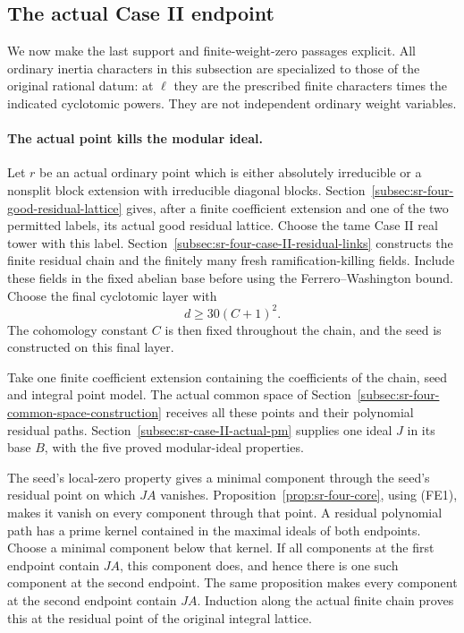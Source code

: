 \subsection{The actual Case II endpoint}
\label{subsec:sr-four-final-endpoint}

We now make the last support and finite-weight-zero passages
explicit. All ordinary inertia characters in this subsection
are specialized to those of the original rational datum:
at \(\ell\) they are the prescribed finite characters times
the indicated cyclotomic powers. They are not independent
ordinary weight variables.

\paragraph{The actual point kills the modular ideal.}
Let \(r\) be an actual ordinary point which is either
absolutely irreducible or a nonsplit block extension with
irreducible diagonal blocks.
Section~\ref{subsec:sr-four-good-residual-lattice} gives,
after a finite coefficient extension and one of the two
permitted labels, its actual good residual lattice.
Choose the tame Case II real tower with this label.
Section~\ref{subsec:sr-four-case-II-residual-links} constructs
the finite residual chain and the finitely many fresh
ramification-killing fields.
Include these fields in the fixed abelian base before
using the Ferrero--Washington bound.
Choose the final cyclotomic layer with
\[
                              d\ge30(C+1)^2 .
 \tag{FE1}
\]
The cohomology constant \(C\) is then fixed throughout the
chain, and the seed is constructed on this final layer.

Take one finite coefficient extension containing the
coefficients of the chain, seed and integral point model.
The actual common space of
Section~\ref{subsec:sr-four-common-space-construction}
receives all these points and their polynomial residual
paths. Section~\ref{subsec:sr-case-II-actual-pm} supplies
one ideal \(J\) in its base \(B\), with the five proved
modular-ideal properties.

The seed's local-zero property gives a minimal component
through the seed's residual point on which \(JA\) vanishes.
Proposition~\ref{prop:sr-four-core}, using (FE1), makes it
vanish on every component through that point.
A residual polynomial path has a prime kernel contained in
the maximal ideals of both endpoints.
Choose a minimal component below that kernel.
If all components at the first endpoint contain \(JA\),
this component does, and hence there is one such component
at the second endpoint. The same proposition makes every
component at the second endpoint contain \(JA\).
Induction along the actual finite chain proves this at the
residual point of the original integral lattice.

